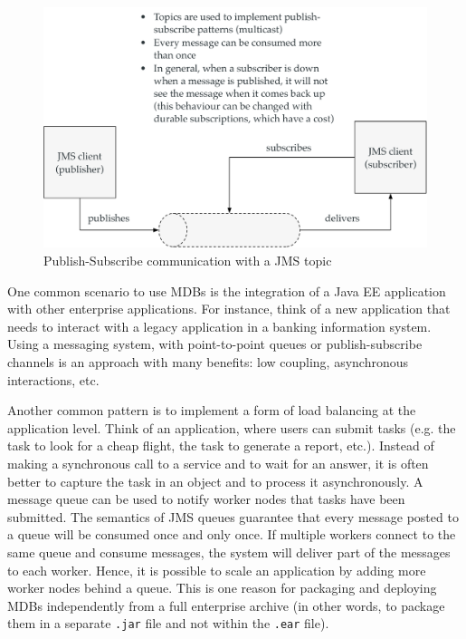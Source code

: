 \begin{figure}[]
	\centering
    \includegraphics[width=1.0\linewidth]{Figures/jms-topic.pdf}
	\caption{Publish-Subscribe communication with a JMS topic}
  \label{fig:jms-topic}
\end{figure}

One common scenario to use \ac{MDB}s is the integration of a \ac{Java EE} application with other enterprise applications. For instance, think of a new application that needs to interact with a legacy application in a banking information system. Using a messaging system, with point-to-point queues or publish-subscribe channels is an approach with many benefits: low coupling, asynchronous interactions, etc.

Another common pattern is to implement a form of load balancing at the application level. Think of an application, where users can submit tasks (e.g. the task to look for a cheap flight, the task to generate a report, etc.). Instead of making a synchronous call to a service and to wait for an answer, it is often better to capture the task in an object and to process it asynchronously. A message queue can be used to notify worker nodes that tasks have been submitted. The semantics of JMS queues guarantee that every message posted to a queue will be consumed once and only once. If multiple workers connect to the same queue and consume messages, the system will deliver part of the messages to each worker. Hence, it is possible to scale an application by adding more worker nodes behind a queue. This is one reason for packaging and deploying \ac{MDB}s independently from a full enterprise archive (in other words, to package them in a separate \texttt{.jar} file and not within the \texttt{.ear} file).


